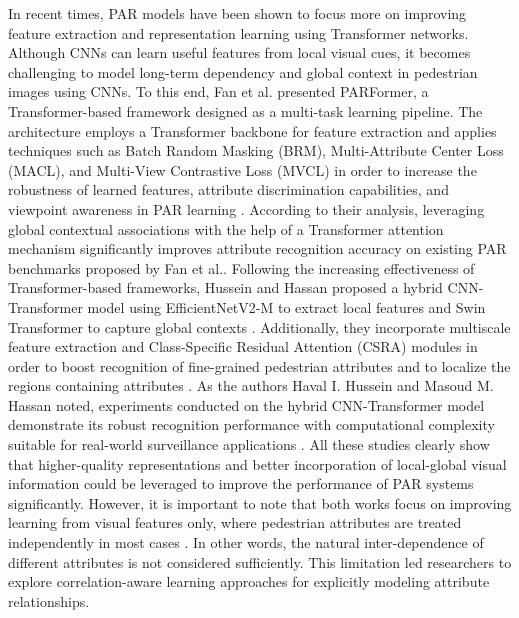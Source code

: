 \documentclass{ieeeaccess}
\begin{document}
In recent times, PAR models have been shown to focus more on improving feature extraction and representation learning using Transformer networks. Although CNNs can learn useful features from local visual cues, it becomes challenging to model long-term dependency and global context in pedestrian images using CNNs. To this end, Fan et al. presented PARFormer, a Transformer-based framework designed as a multi-task learning pipeline. The architecture employs a Transformer backbone for feature extraction and applies techniques such as Batch Random Masking (BRM), Multi-Attribute Center Loss (MACL), and Multi-View Contrastive Loss (MVCL) in order to increase the robustness of learned features, attribute discrimination capabilities, and viewpoint awareness in PAR learning \cite{bib1}. According to their analysis, leveraging global contextual associations with the help of a Transformer attention mechanism significantly improves attribute recognition accuracy on existing PAR benchmarks proposed by Fan et al.\cite{bib1}. Following the increasing effectiveness of Transformer-based frameworks, Hussein and Hassan proposed a hybrid CNN-Transformer model using EfficientNetV2-M to extract local features and Swin Transformer to capture global contexts \cite{bib2}. Additionally, they incorporate multiscale feature extraction and Class-Specific Residual Attention (CSRA) modules in order to boost recognition of fine-grained pedestrian attributes and to localize the regions containing attributes \cite{bib1}. As the authors Haval I. Hussein and Masoud M. Hassan noted, experiments conducted on the hybrid CNN-Transformer model demonstrate its robust recognition performance with computational complexity suitable for real-world surveillance applications \cite{bib2}. All these studies clearly show that higher-quality representations and better incorporation of local-global visual information could be leveraged to improve the performance of PAR systems significantly. However, it is important to note that both works focus on improving learning from visual features only, where pedestrian attributes are treated independently in most cases \cite{bib1,bib2}. In other words, the natural inter-dependence of different attributes is not considered sufficiently. This limitation led researchers to explore correlation-aware learning approaches for explicitly modeling attribute relationships.
\end{document}
